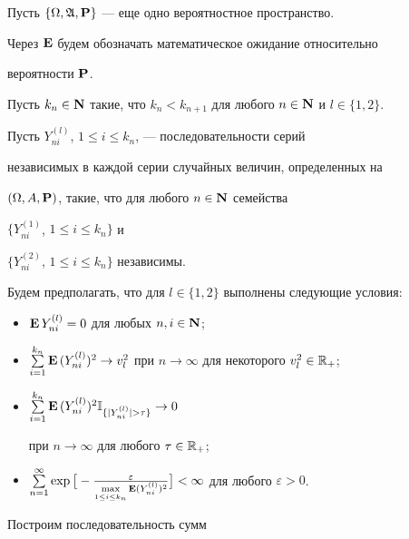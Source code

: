 Пусть $\{\Omega, \frak A, \bold P\}$ --- еще одно вероятностное пространство.


Через $\bold E$ будем обозначать математическое ожидание относительно 


вероятности $\bold P$.





Пусть $k_n\in \bold N$ такие, что $k_n<k_{n+1}$ для любого $n\in\bold N$ и $l\in\{1,2\}$.


Пусть $Y^{(l)}_{ni}$, $1\leq i \leq k_n$, --- последовательности серий 


независимых в каждой серии случайных величин, определенных на


$(\Omega, A, \bold P)$, такие, что для любого $n\in\bold N$ семейства


$\{Y^{(1)}_{ni}$, $1\leq i \leq k_n\}$ и


$\{Y^{(2)}_{ni}$, $1\leq i \leq k_n\}$ независимы.


Будем предполагать, что для $l\in\{1,2\}$ выполнены следующие условия:





\begin{itemize}


\item[(2)]  $\bold E\,Y^{(l)}_{ni} = 0$ для любых $n,i \in\bold N$;


\item[(3)] $\sum\limits_{i=1}^{k_n}\E\,(Y^{(l)}_{ni})^2 \rightarrow


v_l^2$ при $n\rightarrow\infty$ для некоторого $v_l^2\in \Bbb R_+$;


\item[(4)] $\sum\limits_{i=1}^{k_n}\E\,(Y^{(l)}_{ni})^2


\IND_{\{|Y^{(l)}_{ni}|>\tau\}}\rightarrow 0$


при $n\rightarrow\infty$ для любого $\tau\in\Bbb R_+$;


\item[(5)] $\sum\limits_{n=1}^{\infty}


\exp\big[-\frac{\varepsilon}{\max\limits_{1\le i\le k_n}\E


(Y^{(l)}_{ni})^2}\big]<\infty$ для любого $\varepsilon>0$.


\end{itemize}





Построим последовательность сумм


